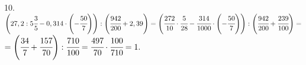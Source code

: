 10. $\left(27,2:5\cfrac{3}{5}-0,314\cdot\left(-\cfrac{50}{7}\right)\right):\left(\cfrac{942}{200}+2,39\right)=
\left(\cfrac{272}{10}\cdot\cfrac{5}{28}-\cfrac{314}{1000}\cdot\left(-\cfrac{50}{7}\right)\right):\left(\cfrac{942}{200}+\cfrac{239}{100}\right)=$\\
$=\left(\cfrac{34}{7}+\cfrac{157}{70}\right):\cfrac{710}{100}=\cfrac{497}{70}\cdot\cfrac{100}{710}=1.$\\
